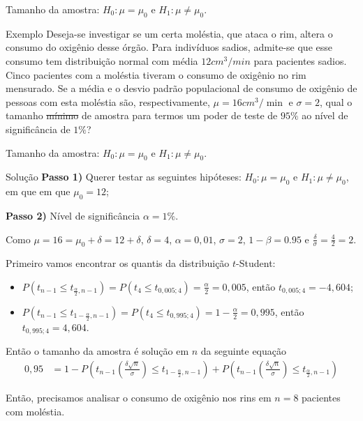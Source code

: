 \documentclass[8pt]{beamer}
\begin{document}
\begin{frame}{Tamanho da amostra: $H_0:\mu = \mu_0$ e $H_1: \mu \neq \mu_0$.}

\large
\begin{block}{Exemplo}
	Deseja-se investigar se um certa moléstia, que ataca o rim, altera o consumo do oxigênio desse órgão. Para indivíduos sadios, admite-se que esse consumo tem distribuição normal com média $12cm^3/min$ para pacientes sadios.
	Cinco pacientes com a moléstia tiveram o consumo de oxigênio no rim mensurado. Se a média e o desvio padrão populacional de consumo de oxigênio de pessoas com esta moléstia são, respectivamente, $\mu=16cm^3/\min$ e $\sigma=2$, qual o tamanho \sout{mínimo} de amostra para termos um poder de teste de $95\%$ ao nível de significância de $1\%$?
\end{block}
\normalsize

\end{frame}

\begin{frame}{Tamanho da amostra: $H_0:\mu = \mu_0$ e $H_1: \mu \neq \mu_0$.}


\begin{block}{Solução}
	\textbf{Passo 1)} Querer testar as seguintes hipóteses: $H_0: \mu = \mu_0$ e $H_1: \mu \neq \mu_0$, em que 	em que $\mu_0=12$;

	
	\textbf{Passo 2)} Nível de significância $\alpha=1\%$.

	
	Como $\mu=16=\mu_0+\delta=12+\delta$, $\delta=4$, $\alpha=0,01$, $\sigma=2$, $1-\beta=0.95$ e $\frac{\delta}{\sigma} = \frac{4}{2}=2$.
	
	Primeiro vamos encontrar os quantis da distribuição $t$-Student:
	\begin{itemize}
		\item $P(t_{n-1} \leq t_{\frac{\alpha}{2}, n-1} ) = P(t_{4} \leq t_{0,005; 4} ) = \frac{\alpha}{2} = 0,005$, então $t_{0,005; 4}=-4,604$;
		\item $P(t_{n-1} \leq t_{1-\frac{\alpha}{2}, n-1} ) = P(t_{4} \leq t_{0,995; 4} ) =1- \frac{\alpha}{2} = 0,995$, então $t_{0,995; 4}=4,604$.
	\end{itemize}
	
	Então o tamanho da amostra é solução em $n$ da seguinte equação
	\begin{align*}
	0,95 &= 1 - P\left( t_{n-1}\left(\frac{\delta\sqrt{n}}{\sigma}\right) \leq t_{1-\frac{\alpha}{2}, n-1} \right) + P\left( t_{n-1}\left(\frac{\delta\sqrt{n}}{\sigma}\right) \leq t_{\frac{\alpha}{2}, n-1} \right)
	\end{align*} 
\end{block}
Então, precisamos analisar o consumo de oxigênio nos rins em $n=8$ pacientes com moléstia.


\end{frame}
\end{document}
